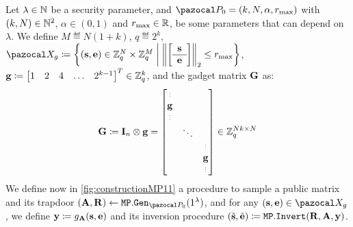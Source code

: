 {  \begin{definition}[{\cite{MP11}}]\label{def:MP11construction}
    Let $\lambda \in \mathbb{N}$ be a security parameter, and $\cP_0 = (k, N, \alpha, r_{\max})$ with $(k,N) \in \mathbb{N}^2$, $\alpha \in (0,1)$ and $r_{\max} \in \mathbb{R}$, be some parameters that can depend on $\lambda$. We define $M \eqdef N(1+k)$, $q \eqdef 2^k$, $\cX_g \eqdef \left\{(\vect{s},\vect{e}) \in \Z_q^N \times \Z_q^M \middle| \left\|\SmallBlockMatrix{\vect{s}}{\vect{e}}\right\|_2 \leq r_{\max} \right\}$, $\mathbf{g} \coloneqq \begin{bmatrix}
      1 & 2 & 4 & \dots & 2^{k-1}
    \end{bmatrix}^T
    \in \mathbb{Z}_q^{k}$, and the gadget matrix $\mathbf{G}$ as:
    \begin{align}
      \vect{G} \eqdef \vect{I}_n \otimes \vect{g} =
      \begin{bmatrix}
        \scalebox{.5}{\vdots} \\
        \vect{g}\\
        \scalebox{.5}{\vdots} \\
        & \ddots\\
        & &\scalebox{.5}{\vdots} \\
        & &\vect{g}\\
        & &\scalebox{.5}{\vdots} \\
      \end{bmatrix} \in \Z_q^{Nk \times N}
    \end{align}
    We define now in \cref{fig:constructionMP11} a procedure to sample a public matrix and its trapdoor $(\vect{A}, \vect{R}) \gets \MPGen_{\cP_0}(1^\lambda)$, and for any $(\vect{s}, \vect{e}) \in \cX_g$, we define $\mathbf{y} \coloneqq g_{\mathbf{A}}(\mathbf{s}, \mathbf{e})$ and its inversion procedure $(\tilde{\mathbf{s}}, \tilde{\mathbf{e}}) \coloneqq {\tt MP.Invert}(\mathbf{R}, \mathbf{A}, \mathbf{y})$.
    \begin{figure}[htb]
      \centering
      \begin{pchstack}[boxed, center,space=0.3cm]
        \begin{pcvstack}[space=0.3cm]
          {\normalfont{}}
\end{pcvstack}
\end{pchstack}
\end{figure}
\end{definition}}
